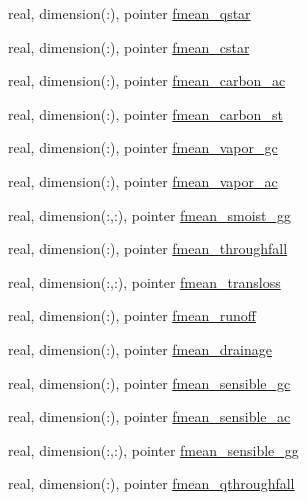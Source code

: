 \begin{DoxyCompactItemize}
\item 
real, dimension(\+:), pointer \hyperlink{structed__state__vars_1_1sitetype_adae48c916f0d81424fdebad531803807}{fmean\+\_\+qstar}
\item 
real, dimension(\+:), pointer \hyperlink{structed__state__vars_1_1sitetype_ac6613e503f6ba997bf4de7d58879b109}{fmean\+\_\+cstar}
\item 
real, dimension(\+:), pointer \hyperlink{structed__state__vars_1_1sitetype_a3132d73931e2f92ce53284f39cf7a1f6}{fmean\+\_\+carbon\+\_\+ac}
\item 
real, dimension(\+:), pointer \hyperlink{structed__state__vars_1_1sitetype_a2e16e4208274e426f7dfd63eae841206}{fmean\+\_\+carbon\+\_\+st}
\item 
real, dimension(\+:), pointer \hyperlink{structed__state__vars_1_1sitetype_afd8b2e49c78ee32bcee76fabc9d4aa69}{fmean\+\_\+vapor\+\_\+gc}
\item 
real, dimension(\+:), pointer \hyperlink{structed__state__vars_1_1sitetype_a3f0931359295ebe90991caf1d6607ff5}{fmean\+\_\+vapor\+\_\+ac}
\item 
real, dimension(\+:,\+:), pointer \hyperlink{structed__state__vars_1_1sitetype_ad3a63fe68b10bf28380197b8c555100a}{fmean\+\_\+smoist\+\_\+gg}
\item 
real, dimension(\+:), pointer \hyperlink{structed__state__vars_1_1sitetype_a3ca05122a62a78cf388a767aafa9d81a}{fmean\+\_\+throughfall}
\item 
real, dimension(\+:,\+:), pointer \hyperlink{structed__state__vars_1_1sitetype_a2d402aaf470bf24d7bdd3561eda8a7b4}{fmean\+\_\+transloss}
\item 
real, dimension(\+:), pointer \hyperlink{structed__state__vars_1_1sitetype_a9cf2267fe5bb7d0e41f25b9d244a89ec}{fmean\+\_\+runoff}
\item 
real, dimension(\+:), pointer \hyperlink{structed__state__vars_1_1sitetype_a1cbc1d5607854ff9f9ac3dfad8fdfe71}{fmean\+\_\+drainage}
\item 
real, dimension(\+:), pointer \hyperlink{structed__state__vars_1_1sitetype_a2e75beb13bd8e13b380df8bf3d8dbbb5}{fmean\+\_\+sensible\+\_\+gc}
\item 
real, dimension(\+:), pointer \hyperlink{structed__state__vars_1_1sitetype_af76458e3ec36ce066237f10f91ee035a}{fmean\+\_\+sensible\+\_\+ac}
\item 
real, dimension(\+:,\+:), pointer \hyperlink{structed__state__vars_1_1sitetype_a9a07904d348a809302f8aa9753621ae9}{fmean\+\_\+sensible\+\_\+gg}
\item 
real, dimension(\+:), pointer \hyperlink{structed__state__vars_1_1sitetype_aa1496e0c225f671998ca75f375daca40}{fmean\+\_\+qthroughfall}

\end{DoxyCompactItemize}

